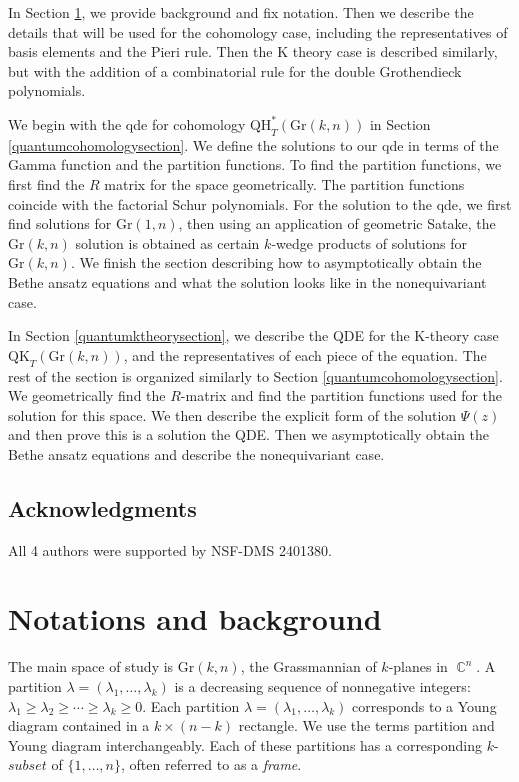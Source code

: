 \documentclass[12pt]{article}
\DeclareMathOperator{\C}{\mathbb{C}}
\theoremstyle{plain}
\theoremstyle{definition}
\newcommand{\reese}[1]{\textcolor{blue}{reese: #1}}
\begin{document}

In Section \ref{background}, we provide background and fix notation. Then we describe the details that will be used for the cohomology case, including the representatives of basis elements and the Pieri rule. Then the K theory case is described similarly, but with the addition of a combinatorial rule for the double Grothendieck polynomials.

We begin with the qde for cohomology  $\mathrm{QH}^*_T(\mathrm{Gr}(k,n))$ in Section \ref{quantumcohomologysection}. We define the solutions to our qde in terms of the Gamma function and the partition functions. To find the partition functions, we first find the $R$ matrix for the space geometrically. The partition functions coincide with the factorial Schur polynomials. For the solution to the qde, we first find solutions for $\mathrm{Gr}(1,n)$, then using an application of geometric Satake, the $\mathrm{Gr}(k,n)$ solution is obtained as certain $k$-wedge products of solutions for $\mathrm{Gr}(k,n)$. We finish the section describing how to asymptotically obtain the Bethe ansatz equations and what the solution looks like in the nonequivariant case.

In Section \ref{quantumktheorysection}, we describe the QDE for the K-theory case $\mathrm{QK}_T(\mathrm{Gr}(k,n))$, and the representatives of each piece of the equation. The  rest of the section is organized similarly to Section \ref{quantumcohomologysection}. We geometrically find the $R$-matrix and find the partition functions used for the solution for this space. We then describe the explicit form of the solution $\Psi(z)$ and then prove this is a solution the QDE. Then we asymptotically obtain the Bethe ansatz equations and describe the nonequivariant case.

\subsection{Acknowledgments}

All 4 authors were supported by NSF-DMS 2401380. 


\section{Notations and background} \label{background}
The main space of study is $\textrm{Gr}(k,n)$, the Grassmannian of $k$-planes in $\C^n$. 
A partition $\lambda =(\lambda_1,\dots, \lambda_k)$ is a decreasing sequence of nonnegative integers: $\lambda_1 \geq \lambda_2\geq \cdots \geq \lambda_k \geq 0$. Each partition $\lambda=(\lambda_1,\dots,\lambda_k)$ corresponds to a Young diagram contained in a $k \times (n-k)$ rectangle. We use the terms partition and Young diagram interchangeably. Each of these partitions has a corresponding $k$-$subset$ of $\{1,\dots,n\}$, often referred to as a \emph{frame}. 
\end{document}
